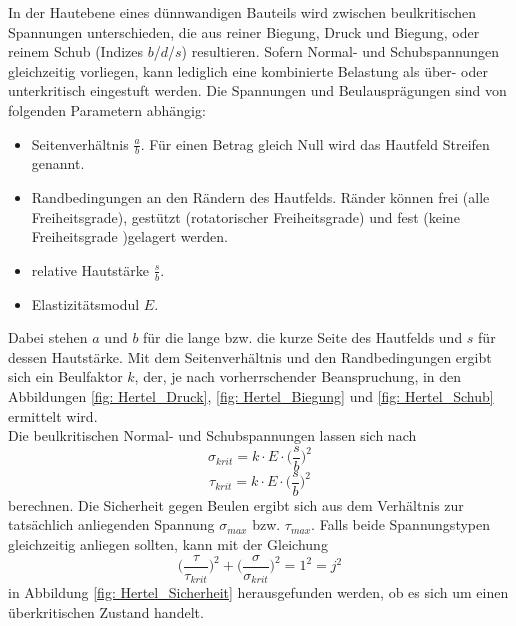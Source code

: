 \noindent In der Hautebene eines dünnwandigen Bauteils wird zwischen beulkritischen Spannungen unterschieden, die aus reiner Biegung, Druck und Biegung, oder reinem Schub (Indizes $b$/$d$/$s$) resultieren. Sofern Normal- und Schubspannungen gleichzeitig vorliegen, kann lediglich eine kombinierte Belastung als über- oder unterkritisch eingestuft werden. Die Spannungen und Beulausprägungen sind von folgenden Parametern abhängig:
\begin{itemize}
	\item Seitenverhältnis $\frac{a}{b}$. Für einen Betrag gleich Null wird das Hautfeld \glqq Streifen\grqq\: genannt. 
	\item Randbedingungen an den Rändern des Hautfelds. Ränder können frei (alle Freiheitsgrade), gestützt (rotatorischer Freiheitsgrade) und fest (keine Freiheitsgrade )gelagert werden.
	\item relative Hautstärke $\frac{s}{b}$.
	\item Elastizitätsmodul $E$.
\end{itemize}
Dabei stehen $a$ und $b$ für die lange bzw. die kurze Seite des Hautfelds und $s$ für dessen Hautstärke. Mit dem Seitenverhältnis und den Randbedingungen ergibt sich ein Beulfaktor $k$, der, je nach vorherrschender Beanspruchung, in den Abbildungen \ref{fig: Hertel_Druck}, \ref{fig: Hertel_Biegung} und \ref{fig: Hertel_Schub}  ermittelt wird. \\
Die beulkritischen Normal- und Schubspannungen lassen sich nach
\begin{equation}
	\sigma_{krit}=k\cdot E\cdot\Big(\frac{s}{b}\Big)^{2}
\end{equation}
\begin{equation}
	\tau_{krit}=k\cdot E\cdot\Big(\frac{s}{b}\Big)^{2}
\end{equation}
berechnen. Die Sicherheit gegen Beulen ergibt sich aus dem Verhältnis zur tatsächlich anliegenden Spannung $\sigma_{max}$ bzw. $\tau_{max}$. Falls beide Spannungstypen gleichzeitig anliegen sollten, kann mit der Gleichung
\begin{equation}
	\Big(\frac{\tau}{\tau_{krit}}\Big)^{2}+\Big(\frac{\sigma}{\sigma_{krit}}\Big)^{2}=1^{2}=j^{2}
\end{equation}
in Abbildung \ref{fig: Hertel_Sicherheit} herausgefunden werden, ob es sich um einen überkritischen Zustand handelt.\\

